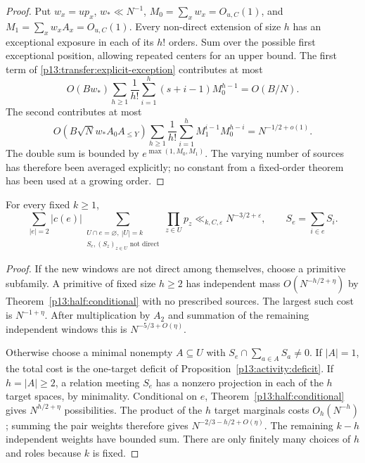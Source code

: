 \begin{proof}
Put $w_x=up_x$, $w_*\ll N^{-1}$,
$M_0=\sum_xw_x=O_{u,C}(1)$, and
$M_1=\sum_xw_xA_x=O_{u,C}(1)$.
Every non-direct extension of size $h$ has an exceptional exposure
in each of its $h!$ orders. Sum over the possible first exceptional
position, allowing repeated centers for an upper bound. The first term
of \eqref{p13:transfer:explicit-exception} contributes at most
\[
 O(Bw_*)\sum_{h\geq1}\frac1{h!}
              \sum_{i=1}^h(s+i-1)M_0^{h-1}=O(B/N).
\]
The second contributes at most
\[
 O(B\sqrt Nw_*A_0A_{\leq Y})
 \sum_{h\geq1}\frac1{h!}\sum_{i=1}^h M_1^{i-1}M_0^{h-i}
       =N^{-1/2+o(1)}.
\]
The double sum is bounded by $e^{\max(1,M_0,M_1)}$.
The varying number of sources has therefore been averaged explicitly;
no constant from a fixed-order theorem has been used at a growing order.
\end{proof}

\begin{lemma}
\label{p13:transfer:fixed-deficit}
For every fixed $k\geq1$,
\begin{equation}
 \sum_{|e|=2}|c(e)|
 \sum_{\substack{U\cap e=\varnothing,\ |U|=k\\
                  S_e,(S_z)_{z\in U}\text{ not direct}}}
                  \prod_{z\in U}p_z
 \ll_{k,C,\varepsilon}N^{-3/2+\varepsilon},
 \qquad S_e=\sum_{i\in e}S_i.
 \label{p13:transfer:fixed-pair-bound}
\end{equation}
\end{lemma}

\begin{proof}
If the new windows are not direct among themselves, choose a primitive
subfamily. A primitive of fixed size $h\geq2$ has independent mass
$O(N^{-h/2+\eta})$ by Theorem~\ref{p13:half:conditional} with no
prescribed sources. The largest such cost is $N^{-1+\eta}$.
After multiplication by $A_2$ and summation of the remaining independent
windows this is $N^{-5/3+O(\eta)}$.

Otherwise choose a minimal nonempty $A\subseteq U$ with
$S_e\cap\sum_{a\in A}S_a\ne0$.
If $|A|=1$, the total cost is the one-target deficit
of Proposition~\ref{p13:activity:deficit}.
If $h=|A|\geq2$, a relation meeting $S_e$ has a nonzero projection in
each of the $h$ target spaces, by minimality. Conditional on $e$,
Theorem~\ref{p13:half:conditional} gives $N^{h/2+\eta}$ possibilities.
The product of the $h$ target marginals costs $O_h(N^{-h})$; summing
the pair weights therefore gives $N^{-2/3-h/2+O(\eta)}$.
The remaining $k-h$ independent weights have bounded sum. There are
only finitely many choices of $h$ and roles because $k$ is fixed.
\end{proof}


